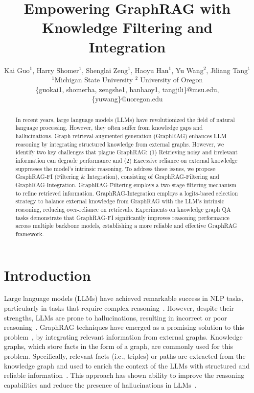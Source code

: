 \documentclass[11pt]{article}
\title{Empowering GraphRAG with Knowledge Filtering and Integration}
\author{Kai Guo$^{1}$, Harry Shomer$^1$, Shenglai Zeng$^1$, Haoyu Han$^1$, Yu Wang$^{2}$, Jiliang Tang$^{1}$ 
\\ 
$^1$Michigan State University  \quad $^2$ University of Oregon  
  \\
\{guokai1, shomerha, zengshe1, hanhaoy1, tangjili\}@msu.edu, \\
\{yuwang\}@uoregon.edu
}
\newcommand{\harry}[1]{{\color{orange}[Harry:#1]}}
\begin{document}
\maketitle
\begin{abstract}
In recent years, large language models (LLMs) have revolutionized the field of natural language processing. However, they often suffer from knowledge gaps and hallucinations. Graph retrieval-augmented generation (GraphRAG) enhances LLM reasoning by integrating structured knowledge from external graphs. However, we identify two key challenges that plague GraphRAG: (1) Retrieving noisy and irrelevant information can degrade performance and (2) Excessive reliance on external knowledge suppresses the model’s intrinsic reasoning.  
To address these issues, we propose GraphRAG-FI (Filtering \& Integration), consisting of GraphRAG-Filtering and GraphRAG-Integration. GraphRAG-Filtering employs a two-stage filtering mechanism to refine retrieved information. GraphRAG-Integration employs a logits-based selection strategy to balance external knowledge from GraphRAG with the LLM’s intrinsic reasoning, reducing over-reliance on retrievals.
Experiments on knowledge graph QA tasks demonstrate that GraphRAG-FI significantly improves reasoning performance across multiple backbone models, establishing a more reliable and effective GraphRAG framework.
\end{abstract}

\section{Introduction}

Large language models (LLMs) have achieved remarkable success in NLP tasks, particularly in tasks that require complex reasoning~\cite{havrillaglore,wu2023symbol,hao2023reasoning}. However, despite their strengths, LLMs are prone to hallucinations, resulting in incorrect or poor reasoning~\cite{ji2023towards,huang2024survey,sriramanan2025llm}. GraphRAG techniques have emerged as a promising solution to this problem~\cite{han2024retrieval,zhang2025survey,he2025g,mavromatis2024gnn}, by integrating relevant information from external graphs. Knowledge graphs, which store facts in the form of a graph, are commonly used for this problem. Specifically, relevant facts (i.e., triples) or paths are extracted from the knowledge graph and used to enrich the context of the LLMs with structured and reliable information~\cite{luo2024rog,li2024subgraphrag,ma2024think}. This approach has shown ability to improve the reasoning capabilities and reduce the presence of hallucinations in LLMs~\cite{sunthink,li2024subgraphrag,dong2024don}. 
\end{document}
